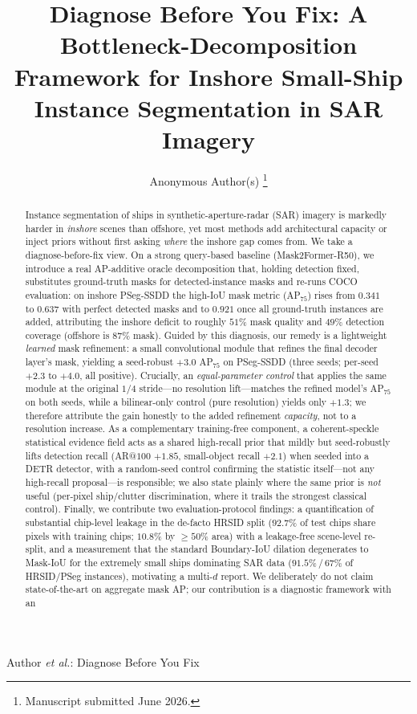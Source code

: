 \documentclass[journal]{IEEEtran}
\begin{document}
\title{Diagnose Before You Fix: A Bottleneck-Decomposition Framework for Inshore Small-Ship Instance Segmentation in SAR Imagery}

\author{Anonymous Author(s)%
\thanks{Manuscript submitted June 2026.}}

%
{Author \MakeLowercase{\textit{et al.}}: Diagnose Before You Fix}

\maketitle

\begin{abstract}
Instance segmentation of ships in synthetic-aperture-radar (SAR) imagery is markedly harder in \emph{inshore} scenes than offshore, yet most methods add architectural capacity or inject priors without first asking \emph{where} the inshore gap comes from. We take a diagnose-before-fix view. On a strong query-based baseline (Mask2Former-R50), we introduce a real AP-additive oracle decomposition that, holding detection fixed, substitutes ground-truth masks for detected-instance masks and re-runs COCO evaluation: on inshore PSeg-SSDD the high-IoU mask metric (AP$_{75}$) rises from $0.341$ to $0.637$ with perfect detected masks and to $0.921$ once all ground-truth instances are added, attributing the inshore deficit to roughly $51\%$ mask quality and $49\%$ detection coverage (offshore is $87\%$ mask). Guided by this diagnosis, our remedy is a lightweight \emph{learned} mask refinement: a small convolutional module that refines the final decoder layer's mask, yielding a seed-robust $+3.0$ AP$_{75}$ on PSeg-SSDD (three seeds; per-seed $+2.3$ to $+4.0$, all positive). Crucially, an \emph{equal-parameter control} that applies the same module at the original $1/4$ stride---no resolution lift---matches the refined model's AP$_{75}$ on both seeds, while a bilinear-only control (pure resolution) yields only $+1.3$; we therefore attribute the gain honestly to the added refinement \emph{capacity}, not to a resolution increase. As a complementary training-free component, a coherent-speckle statistical evidence field acts as a shared high-recall prior that mildly but seed-robustly lifts detection recall (AR@$100$ $+1.85$, small-object recall $+2.1$) when seeded into a DETR detector, with a random-seed control confirming the statistic itself---not any high-recall proposal---is responsible; we also state plainly where the same prior is \emph{not} useful (per-pixel ship/clutter discrimination, where it trails the strongest classical control). Finally, we contribute two evaluation-protocol findings: a quantification of substantial chip-level leakage in the de-facto HRSID split ($92.7\%$ of test chips share pixels with training chips; $10.8\%$ by $\ge\!50\%$ area) with a leakage-free scene-level re-split, and a measurement that the standard Boundary-IoU dilation degenerates to Mask-IoU for the extremely small ships dominating SAR data ($91.5\%$\,/\,$67\%$ of HRSID/PSeg instances), motivating a multi-$d$ report. We deliberately do not claim state-of-the-art on aggregate mask AP; our contribution is a diagnostic framework with an 
\end{abstract}
\end{document}
